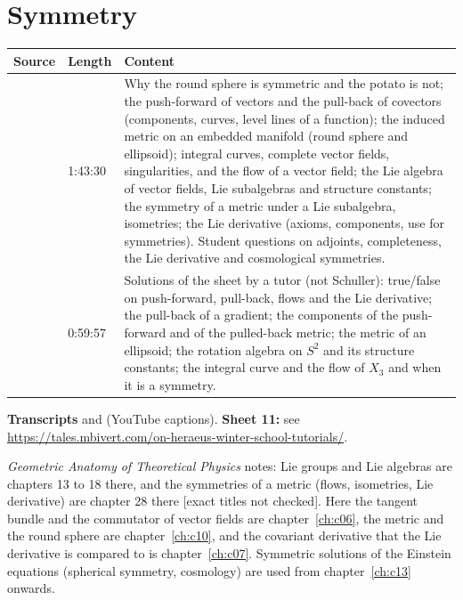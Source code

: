 \chapter{Symmetry}\label{ch:c11}
\begin{paracol}{2}

\begin{sources}
\begin{tabularx}{\linewidth}{@{}l l L@{}}
\toprule
\textbf{Source} & \textbf{Length} & \textbf{Content}\\
\midrule
{} & 1:43:30 & Why the round sphere is symmetric and the potato is not; the push-forward of vectors and the pull-back of covectors (components, curves, level lines of a function); the induced metric on an embedded manifold (round sphere and ellipsoid); integral curves, complete vector fields, singularities, and the flow of a vector field; the Lie algebra of vector fields, Lie subalgebras and structure constants; the symmetry of a metric under a Lie subalgebra, isometries; the Lie derivative (axioms, components, use for symmetries). Student questions on adjoints, completeness, the Lie derivative and cosmological symmetries.\\
 & 0:59:57 & Solutions of the sheet by a tutor (not Schuller): true/false on push-forward, pull-back, flows and the Lie derivative; the pull-back of a gradient; the components of the push-forward and of the pulled-back metric; the metric of an ellipsoid; the rotation algebra on $S^2$ and its structure constants; the integral curve and the flow of $X_3$ and when it is a symmetry.\\
\bottomrule
\end{tabularx}

\smallskip
\textbf{Transcripts}  and  (YouTube captions).
\textbf{Sheet 11:} see \url{https://tales.mbivert.com/on-heraeus-winter-school-tutorials/}.
\end{sources}

\begin{reading}
\emph{Geometric Anatomy of Theoretical Physics} notes: Lie groups and Lie algebras are chapters 13 to 18 there, and the symmetries of a metric (flows, isometries, Lie derivative) are chapter 28 there [exact titles not checked]. Here the tangent bundle and the commutator of vector fields are chapter~\ref{ch:c06}, the metric and the round sphere are chapter~\ref{ch:c10}, and the covariant derivative that the Lie derivative is compared to is chapter~\ref{ch:c07}. Symmetric solutions of the Einstein equations (spherical symmetry, cosmology) are used from chapter~\ref{ch:c13} onwards.
\end{reading}


\end{paracol}
